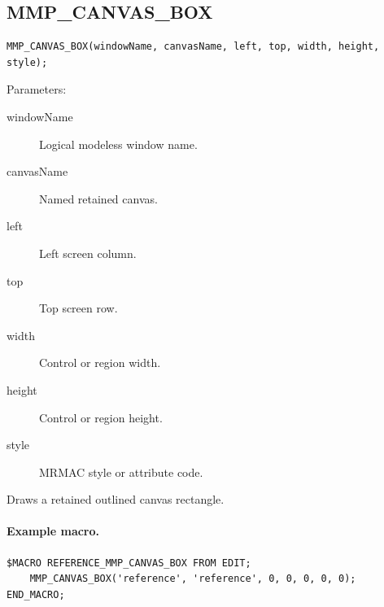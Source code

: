\documentclass[a4paper,10pt,twoside,openany]{book}
\newenvironment{mrmacextension}{\begin{changebar}}{\end{changebar}}
\begin{document}
\begin{mrmacextension}
\label{prim:procedure-mmp-canvas-box}
\subsection*{MMP\_CANVAS\_BOX}
\begin{verbatim}
MMP_CANVAS_BOX(windowName, canvasName, left, top, width, height, style);
\end{verbatim}
Parameters:
\begin{description}
\item[windowName] Logical modeless window name.
\item[canvasName] Named retained canvas.
\item[left] Left screen column.
\item[top] Top screen row.
\item[width] Control or region width.
\item[height] Control or region height.
\item[style] MRMAC style or attribute code.
\end{description}

Draws a retained outlined canvas rectangle.

\paragraph{Example macro.}
\begin{verbatim}
$MACRO REFERENCE_MMP_CANVAS_BOX FROM EDIT;
    MMP_CANVAS_BOX('reference', 'reference', 0, 0, 0, 0, 0);
END_MACRO;
\end{verbatim}
\end{mrmacextension}
\end{document}
